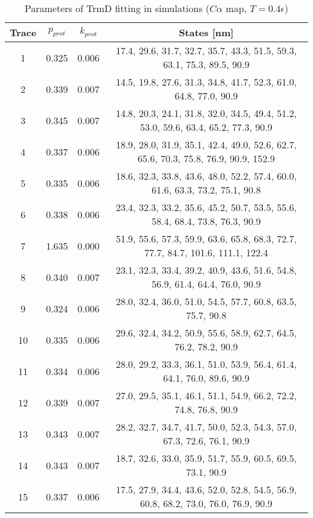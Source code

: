 \begin{table}
    \tiny
    \centering
    \caption{Parameters of TrmD fitting in simulations ($C\alpha$ map, $T=0.4\epsilon$)}
    \label{tab:trmd-cc-parameters}
    \begin{tabular}{c|c|c|c}
        \textbf{Trace} & \textbf{$p_{prot}$} & \textbf{$k_{prot}$} & \textbf{States [nm]}\\\hline
        1 & 0.325 & 0.006 & 17.4, 29.6, 31.7, 32.7, 35.7, 43.3, 51.5, 59.3, 63.1, 75.3, 89.5, 90.9\\
        2 & 0.339 & 0.007 & 14.5, 19.8, 27.6, 31.3, 34.8, 41.7, 52.3, 61.0, 64.8, 77.0, 90.9\\
        3 & 0.345 & 0.007 & 14.8, 20.3, 24.1, 31.8, 32.0, 34.5, 49.4, 51.2, 53.0, 59.6, 63.4, 65.2, 77.3, 90.9\\
        4 & 0.337 & 0.006 & 18.9, 28.0, 31.9, 35.1, 42.4, 49.0, 52.6, 62.7, 65.6, 70.3, 75.8, 76.9, 90.9, 152.9\\
        5 & 0.335 & 0.006 & 18.6, 32.3, 33.8, 43.6, 48.0, 52.2, 57.4, 60.0, 61.6, 63.3, 73.2, 75.1, 90.8\\
        6 & 0.338 & 0.006 & 23.4, 32.3, 33.2, 35.6, 45.2, 50.7, 53.5, 55.6, 58.4, 68.4, 73.8, 76.3, 90.9\\
        7 & 1.635 & 0.000 & 51.9, 55.6, 57.3, 59.9, 63.6, 65.8, 68.3, 72.7, 77.7, 84.7, 101.6, 111.1, 122.4\\
        8 & 0.340 & 0.007 & 23.1, 32.3, 33.4, 39.2, 40.9, 43.6, 51.6, 54.8, 56.9, 61.4, 64.4, 76.0, 90.9\\
        9 & 0.324 & 0.006 & 28.0, 32.4, 36.0, 51.0, 54.5, 57.7, 60.8, 63.5, 75.7, 90.8\\
        10 & 0.335 & 0.006 & 29.6, 32.4, 34.2, 50.9, 55.6, 58.9, 62.7, 64.5, 76.2, 78.2, 90.9\\
        11 & 0.334 & 0.006 & 28.0, 29.2, 33.3, 36.1, 51.0, 53.9, 56.4, 61.4, 64.1, 76.0, 89.6, 90.9\\
        12 & 0.339 & 0.007 & 27.0, 29.5, 35.1, 46.1, 51.1, 54.9, 66.2, 72.2, 74.8, 76.8, 90.9\\
        13 & 0.343 & 0.007 & 28.2, 32.7, 34.7, 41.7, 50.0, 52.3, 54.3, 57.0, 67.3, 72.6, 76.1, 90.9\\
        14 & 0.343 & 0.007 & 18.7, 32.6, 33.0, 35.9, 51.7, 55.9, 60.5, 69.5, 73.1, 90.9\\
        15 & 0.337 & 0.006 & 17.5, 27.9, 34.4, 43.6, 52.0, 52.8, 54.5, 56.9, 60.8, 68.2, 73.0, 76.0, 76.9, 90.9\\\hline
    \end{tabular}
\end{table}

